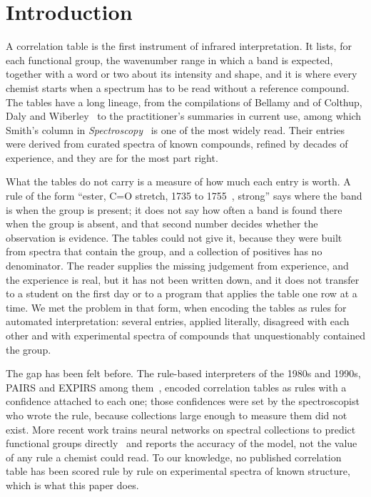 \section{Introduction}
\label{sec:intro}

A correlation table is the first instrument of infrared interpretation. It lists, for each functional group, the wavenumber range in which a band is expected, together with a word or two about its intensity and shape, and it is where every chemist starts when a spectrum has to be read without a reference compound. The tables have a long lineage, from the compilations of Bellamy and of Colthup, Daly and Wiberley~\cite{bellamy1975infrared,colthup1990introduction} to the practitioner's summaries in current use, among which Smith's column in \emph{Spectroscopy}~\cite{smith2025bigreview4,smith2026bigreview8} is one of the most widely read. Their entries were derived from curated spectra of known compounds, refined by decades of experience, and they are for the most part right.

What the tables do not carry is a measure of how much each entry is worth. A rule of the form ``ester, C=O stretch, 1735 to 1755~\wn{}, strong'' says where the band is when the group is present; it does not say how often a band is found there when the group is absent, and that second number decides whether the observation is evidence. The tables could not give it, because they were built from spectra that contain the group, and a collection of positives has no denominator. The reader supplies the missing judgement from experience, and the experience is real, but it has not been written down, and it does not transfer to a student on the first day or to a program that applies the table one row at a time. We met the problem in that form, when encoding the tables as rules for automated interpretation: several entries, applied literally, disagreed with each other and with experimental spectra of compounds that unquestionably contained the group.

The gap has been felt before. The rule-based interpreters of the 1980s and 1990s, PAIRS and EXPIRS among them~\cite{woodruff1980pairs,woodruff1981rules,andreev1996expirs}, encoded correlation tables as rules with a confidence attached to each one; those confidences were set by the spectroscopist who wrote the rule, because collections large enough to measure them did not exist. More recent work trains neural networks on spectral collections to predict functional groups directly~\cite{fine2020spectral,punjabi2025chemotion} and reports the accuracy of the model, not the value of any rule a chemist could read. To our knowledge, no published correlation table has been scored rule by rule on experimental spectra of known structure, which is what this paper does.

